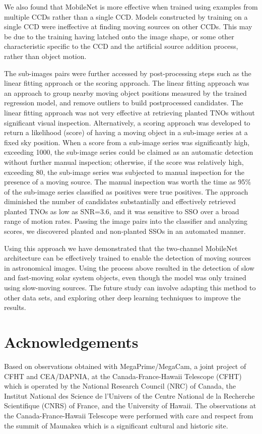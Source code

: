 \documentclass{aastex631}
\begin{document}
We also found that MobileNet is more effective when trained using examples from multiple CCDs rather than a single CCD.
Models constructed by training on a single CCD were ineffective at finding moving sources on other CCDs.
This may be due to the training having latched onto the image shape, or some other characteristic specific to the CCD and the artificial source addition process, rather than object motion.

The sub-images pairs were further accessed by post-processing steps such as the linear fitting approach or the scoring approach.
The linear fitting approach was an approach to group nearby moving object positions measured by the trained regression model, and remove outliers to build postprocessed candidates.
The linear fitting approach was not very effective at retrieving planted TNOs without significant visual inspection.
Alternatively, a scoring approach was developed to return a likelihood (score) of having a moving object in a sub-image series at a fixed sky position.
When a score from a sub-image series was significantly high, exceeding 1000, the sub-image series could be claimed as an automatic detection without further manual inspection; otherwise, if the score was relatively high, exceeding 80, the sub-image series was subjected to manual inspection for the presence of a moving source.
The manual inspection was worth the time as 95\% of the sub-image series classified as positives were true positives.
The approach diminished the number of candidates substantially and effectively retrieved planted TNOs as low as SNR=3.6, and it was sensitive to SSO over a broad range of motion rates.
Passing the image pairs into the classifier and analyzing scores, we discovered planted and non-planted SSOs in an automated manner.

Using this approach we have demonstrated that the two-channel MobileNet architecture can be effectively trained to enable the detection of moving sources in astronomical images.
Using the process above resulted in the detection of slow and fast-moving solar system objects, even though the model was only trained using slow-moving sources.
The future study can involve adapting this method to other data sets, and exploring other deep learning techniques to improve the results.

\section{Acknowledgements}

Based on observations obtained with MegaPrime/MegaCam, a joint project of CFHT and CEA/DAPNIA, at the Canada-France-Hawaii Telescope (CFHT) which is operated by the National Research Council (NRC) of Canada, the Institut National des Science de l'Univers of the Centre National de la Recherche Scientifique (CNRS) of France, and the University of Hawaii. The observations at the Canada-France-Hawaii Telescope were performed with care and respect from the summit of Maunakea which is a significant cultural and historic site.
\end{document}
